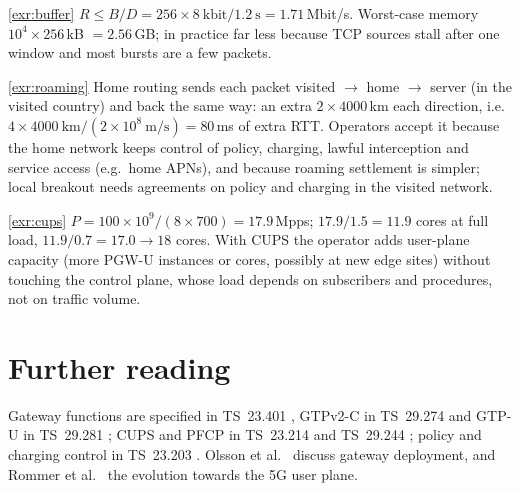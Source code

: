 \documentclass[11pt,a4paper]{article}
\begin{document}
\begin{solutionbox}{\ref{exr:buffer}}
$R \le B/D = 256\times8\ \text{kbit}/1.2\ \text{s} = 1.71$\,Mbit/s. Worst-case memory $10^4\times256$\,kB $= 2.56$\,GB; in
practice far less because TCP sources stall after one window and most bursts are a few packets.
\end{solutionbox}

\begin{solutionbox}{\ref{exr:roaming}}
Home routing sends each packet visited $\to$ home $\to$ server (in the visited country) and back the same way: an
extra $2\times4000$\,km each direction, i.e.\ $4\times4000\ \text{km}/(2\times10^8\ \text{m/s}) = 80$\,ms of extra RTT. Operators
accept it because the home network keeps control of policy, charging, lawful interception and service access
(e.g.\ home APNs), and because roaming settlement is simpler; local breakout needs agreements on policy and
charging in the visited network.
\end{solutionbox}

\begin{solutionbox}{\ref{exr:cups}}
$P = 100\times10^9/(8\times700) = 17.9$\,Mpps; $17.9/1.5 = 11.9$ cores at full load, $11.9/0.7 = 17.0 \to 18$ cores. With
CUPS the operator adds user-plane capacity (more PGW-U instances or cores, possibly at new edge sites) without
touching the control plane, whose load depends on subscribers and procedures, not on traffic volume.
\end{solutionbox}

\section{Further reading}
Gateway functions are specified in TS~23.401 \cite{ts23401}, GTPv2-C in TS~29.274 \cite{ts29274} and GTP-U in
TS~29.281 \cite{ts29281}; CUPS and PFCP in TS~23.214 \cite{ts23214} and TS~29.244 \cite{ts29244}; policy and charging
control in TS~23.203 \cite{ts23203}. Olsson et al.\ \cite{olsson2013epc} discuss gateway deployment, and
Rommer et al.\ \cite{rommer2020core} the evolution towards the 5G user plane.

\printbibliography[heading=subbibliography,title={\ACNstrRefs}]
\end{document}
